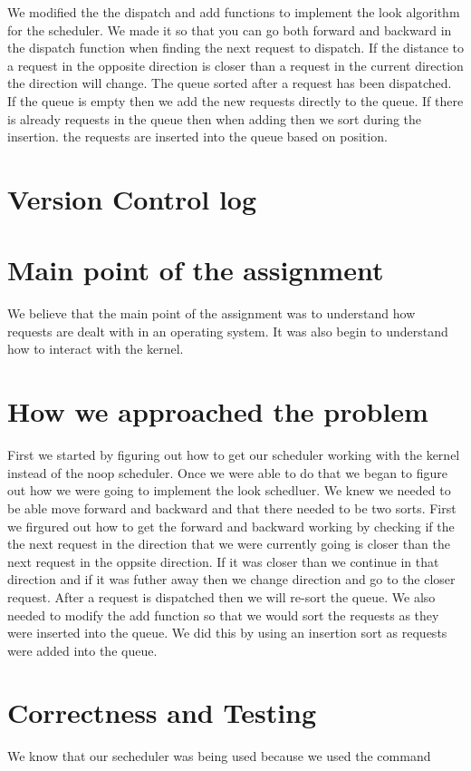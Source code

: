 \documentclass[letterpaper,10pt,titlepage]{article}
\begin{document}
We modified the the dispatch and add functions to implement the look algorithm 
for the scheduler. We made it so that you can go both forward and backward in 
the dispatch function when finding the next request to dispatch. If the 
distance to a request in the opposite direction is closer than a request in 
the current direction the direction will change. The queue sorted after a 
request has been dispatched. If the queue is empty then we add the new 
requests directly to the queue. If there is already requests in the queue 
then when adding then we sort during the insertion. the requests are 
inserted into the queue based on position. 

\section{Version Control log}


\section{Main point of the assignment}
We believe that the main point of the assignment was to understand how requests 
are dealt with in an operating system. It was also begin to understand how to 
interact with the kernel. 

\section{How we approached the problem}
First we started by figuring out how to get our scheduler working with the kernel 
instead of the noop scheduler. Once we were able to do that we began to figure 
out how we were going to implement the look schedluer. We knew we needed to be 
able move forward and backward and that there needed to be two sorts. First we 
firgured out how to get the forward and backward working by checking if the the 
next request in the direction that we were currently going is closer than the 
next request in the oppsite direction. If it was closer than we continue in that 
direction and if it was futher away then we change direction and go to the closer 
request. After a request is dispatched then we will re-sort the queue. We also 
needed to modify the add function so that we would sort the requests as they were 
inserted into the queue. We did this by using an insertion sort as requests were 
added into the queue.

\section{Correctness and Testing}
We know that our secheduler was being used because we used the command
\end{document}

